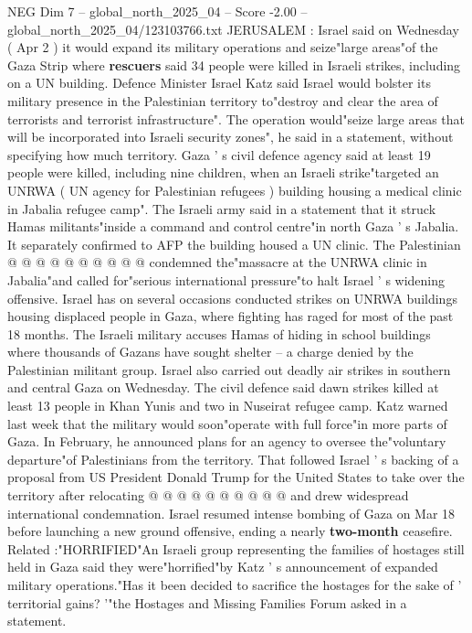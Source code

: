 \begin{textsample}{NEG Dim 7 – global\_north\_2025\_04 – Score -2.00 – global\_north\_2025\_04/123103766.txt}  \label{ex:f7_neg_092}
JERUSALEM : Israel said on Wednesday ( Apr 2 ) it would expand its military operations and seize"large areas"of the Gaza Strip where \textbf{rescuers} said 34 people were killed in Israeli strikes, including on a UN building.
Defence Minister Israel Katz said Israel would bolster its military presence in the Palestinian territory to"destroy and clear the area of terrorists and terrorist infrastructure".
The operation would"seize large areas that will be incorporated into Israeli security zones", he said in a statement, without specifying how much territory.
Gaza ' s civil defence agency said at least 19 people were killed, including nine children, when an Israeli strike"targeted an UNRWA ( UN agency for Palestinian refugees ) building housing a medical clinic in Jabalia refugee camp".
The Israeli army said in a statement that it struck Hamas militants"inside a command and control centre"in north Gaza ' s Jabalia.
It separately confirmed to AFP the building housed a UN clinic.
The Palestinian @ @ @ @ @ @ @ @ @ @ condemned the"massacre at the UNRWA clinic in Jabalia"and called for"serious international pressure"to halt Israel ' s widening offensive.
Israel has on several occasions conducted strikes on UNRWA buildings housing displaced people in Gaza, where fighting has raged for most of the past 18 months.
The Israeli military accuses Hamas of hiding in school buildings where thousands of Gazans have sought shelter -- a charge denied by the Palestinian militant group.
Israel also carried out deadly air strikes in southern and central Gaza on Wednesday.
The civil defence said dawn strikes killed at least 13 people in Khan Yunis and two in Nuseirat refugee camp.
Katz warned last week that the military would soon"operate with full force"in more parts of Gaza.
In February, he announced plans for an agency to oversee the"voluntary departure"of Palestinians from the territory.
That followed Israel ' s backing of a proposal from US President Donald Trump for the United States to take over the territory after relocating @ @ @ @ @ @ @ @ @ @ and drew widespread international condemnation.
Israel resumed intense bombing of Gaza on Mar 18 before launching a new ground offensive, ending a nearly \textbf{two-month} ceasefire.
Related :"HORRIFIED"An Israeli group representing the families of hostages still held in Gaza said they were"horrified"by Katz ' s announcement of expanded military operations."Has it been decided to sacrifice the hostages for the sake of ' territorial gains? '"the Hostages and Missing Families Forum asked in a statement.

\end{textsample}
